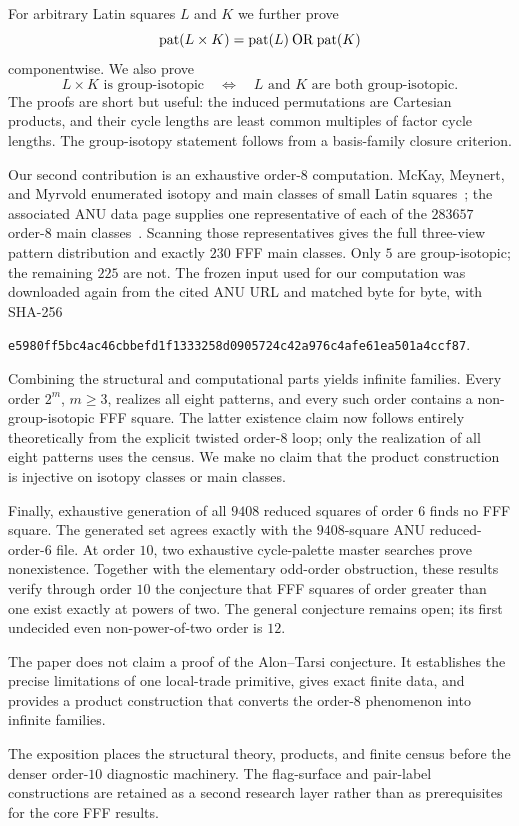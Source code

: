 For arbitrary Latin squares $L$ and $K$ we further prove
\[
  \operatorname{pat}(L\times K)=\operatorname{pat}(L)\mathbin{\mathrm{OR}}\operatorname{pat}(K)
\]
componentwise.  We also prove
\[
  L\times K\text{ is group-isotopic}
  \quad\Longleftrightarrow\quad
  L\text{ and }K\text{ are both group-isotopic}.
\]
The proofs are short but useful: the induced permutations are Cartesian
products, and their cycle lengths are least common multiples of factor cycle
lengths.  The group-isotopy statement follows from a basis-family closure
criterion.

Our second contribution is an exhaustive order-$8$ computation.  McKay,
Meynert, and Myrvold enumerated isotopy and main classes of small Latin
squares~\cite{McKayMeynertMyrvold2007}; the associated ANU data page supplies
one representative of each of the $283657$ order-$8$ main
classes~\cite{McKayLatinData}.  Scanning those representatives gives the full
three-view pattern distribution and exactly $230$ FFF main classes.  Only
$5$ are group-isotopic; the remaining $225$ are not.  The frozen input used
for our computation was downloaded again from the cited ANU URL and matched
byte for byte, with SHA-256
\begin{center}
\small\nolinkurl{e5980ff5bc4ac46cbbefd1f1333258d0905724c42a976c4afe61ea501a4ccf87}.
\end{center}

Combining the structural and computational parts yields infinite families.
Every order $2^m$, $m\geq 3$, realizes all eight patterns, and every such
order contains a non-group-isotopic FFF square.  The latter existence claim
now follows entirely theoretically from the explicit twisted order-$8$ loop;
only the realization of all eight patterns uses the census.  We make no claim
that the product construction is injective on isotopy classes or main classes.

Finally, exhaustive generation of all $9408$ reduced squares of order $6$
finds no FFF square.  The generated set agrees exactly with the $9408$-square
ANU reduced-order-$6$ file.  At order $10$, two exhaustive cycle-palette
master searches prove nonexistence.  Together with the elementary odd-order
obstruction, these results verify through order $10$ the conjecture that FFF
squares of order greater than one exist exactly at powers of two.  The general
conjecture remains open; its first undecided even non-power-of-two order is
$12$.

The paper does not claim a proof of the Alon--Tarsi conjecture.  It establishes
the precise limitations of one local-trade primitive, gives exact finite
data, and provides a product construction that converts the order-$8$
phenomenon into infinite families.

The exposition places the structural theory, products, and finite census
before the denser order-$10$ diagnostic machinery.  The flag-surface and
pair-label constructions are retained as a second research layer rather than
as prerequisites for the core FFF results.
